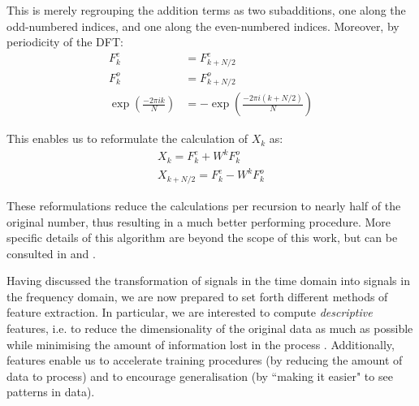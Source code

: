 \documentclass[../main.tex]{subfiles} \label{chapter_soa}
\begin{document}
\par This is merely regrouping the addition terms as two subadditions, one along the odd-numbered indices, and one along the even-numbered indices. Moreover, by periodicity of the DFT:
\begin{align*}
F^e_k &= F^e_{k+N/2}\\
F^o_k &= F^o_{k+N/2}\\
\exp{\left(\frac{-2\pi ik}{N}\right)} &= -\exp {\left(\frac{-2\pi i(k+N/2)}{N} \right)}
\end{align*}
\par This enables us to reformulate the calculation of $X_k$ as:
\begin{align*}
X_k = F^e_k + W^kF^o_k\\
X_{k+N/2} = F^e_k - W^kF^o_k
\end{align*}
\par These reformulations reduce the calculations per recursion to nearly half of the original number, thus resulting in a much better performing procedure. More specific details of this algorithm are beyond the scope of this work, but can be consulted in \cite{Smith2011} and \cite{Cooley1965}.
\par Having discussed the transformation of signals in the time domain into signals in the frequency domain, we are now prepared to set forth different methods of feature extraction. In particular, we are interested to compute \emph{descriptive} features, i.e. to reduce the dimensionality of the original data as much as possible while minimising the amount of information lost in the process \cite{hastie2008}. Additionally, features enable us to accelerate training procedures (by reducing the amount of data to process) and to encourage generalisation (by ``making it easier" to see patterns in data).
\end{document}
